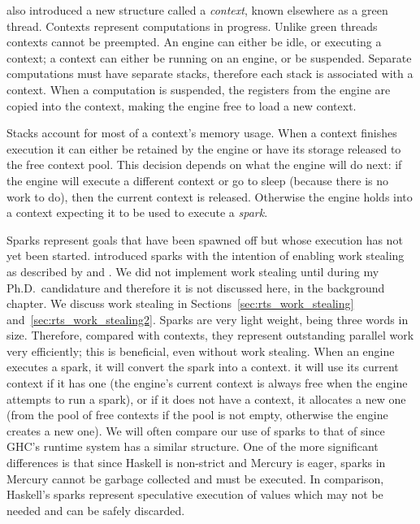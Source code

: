 \citet{conway:2002:par} also introduced a new structure called a
\emph{context}, known elsewhere as a green thread.
Contexts represent computations in progress.
Unlike green threads contexts cannot be preempted.
An engine can either be idle, or executing a context;
a context can either be running on an engine, or be suspended.
Separate computations must have separate stacks,
therefore each stack is associated with a context.
When a computation is suspended,
the registers from the engine are copied into the context,
making the engine free to load a new context.

Stacks account for most of a context's memory usage.
When a context finishes execution
it can either be retained by the engine or
have its storage released to the free context pool.
This decision depends on what the engine will do next:
if the engine will execute a different context or go to sleep
(because there is no work to do),
then the current context is released.
Otherwise the engine holds into a context expecting it to be used to execute
a \emph{spark}.

Sparks represent goals that have been spawned off
but whose execution has not yet been started.
\citet*{wang:2006:hons} introduced sparks with the intention of
enabling work stealing as described by
\citet*{blumofe:1994:work-stealing,halstead:1985:multilisp}
and \citet*{kranz:1989:mul-t}.
We did not implement work stealing until during my Ph.D.\ candidature
and therefore it is not discussed here, in the background chapter.
We discuss work stealing in Sections~\ref{sec:rts_work_stealing}
and~\ref{sec:rts_work_stealing2}.
Sparks are very light weight,
being three words in size.
Therefore, compared with contexts,
they represent outstanding parallel work very efficiently;
this is beneficial, even without work stealing.
When an engine executes a spark, it will convert the spark into a context.
it will use its current context if it has one
(the engine's current context is always free when the engine attempts to run
a spark),
or if it does not have a context,
it allocates a new one
(from the pool of free contexts if the pool is not empty,
otherwise the engine creates a new one).
We will often compare our use of sparks to that of
\citet*{simonmar_2009_multicore_rts} since GHC's runtime system has a
similar structure.
One of the more significant differences
is that since Haskell is non-strict and Mercury is eager,
sparks in Mercury cannot be garbage collected and must be executed.
In comparison,
Haskell's sparks represent speculative execution of values which may not be
needed and can be safely discarded.

